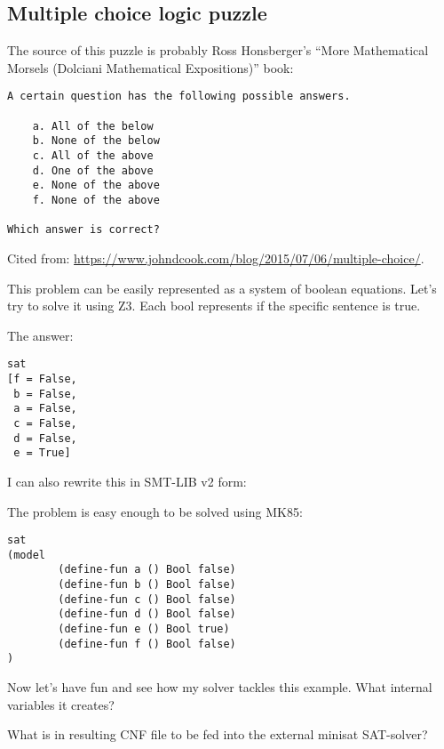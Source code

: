 \subsection{Multiple choice logic puzzle}

The source of this puzzle is probably Ross Honsberger's ``More Mathematical Morsels (Dolciani Mathematical Expositions)'' book:

\begin{lstlisting}
A certain question has the following possible answers.

    a. All of the below
    b. None of the below
    c. All of the above
    d. One of the above
    e. None of the above
    f. None of the above

Which answer is correct?
\end{lstlisting}

Cited from: \url{https://www.johndcook.com/blog/2015/07/06/multiple-choice/}.

This problem can be easily represented as a system of boolean equations.
Let's try to solve it using Z3. Each bool represents if the specific sentence is true.



The answer:

\begin{lstlisting}
sat
[f = False,
 b = False,
 a = False,
 c = False,
 d = False,
 e = True]
\end{lstlisting}

I can also rewrite this in SMT-LIB v2 form:



The problem is easy enough to be solved using MK85:

\begin{lstlisting}
sat
(model
        (define-fun a () Bool false)
        (define-fun b () Bool false)
        (define-fun c () Bool false)
        (define-fun d () Bool false)
        (define-fun e () Bool true)
        (define-fun f () Bool false)
)
\end{lstlisting}

Now let's have fun and see how my solver tackles this example.
What internal variables it creates?



What is in resulting CNF file to be fed into the external minisat SAT-solver?




